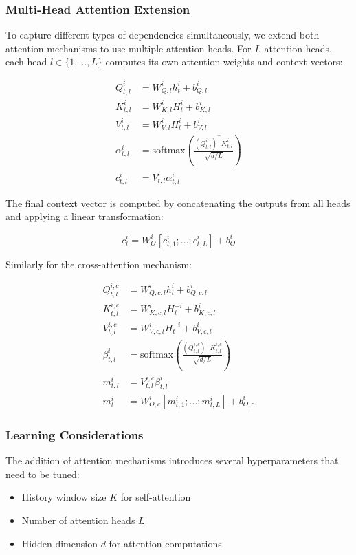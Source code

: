\subsubsection*{Multi-Head Attention Extension}
To capture different types of dependencies simultaneously, we extend both attention mechanisms to use multiple attention heads. For $L$ attention heads, each head $l \in \{1, ..., L\}$ computes its own attention weights and context vectors:

\begin{align*}
Q_{t,l}^i &= W_{Q,l}^i h_t^i + b_{Q,l}^i \\
K_{t,l}^i &= W_{K,l}^i H_t^i + b_{K,l}^i \\
V_{t,l}^i &= W_{V,l}^i H_t^i + b_{V,l}^i \\
\alpha_{t,l}^i &= \text{softmax}\left(\frac{(Q_{t,l}^i)^\top K_{t,l}^i}{\sqrt{d/L}}\right) \\
c_{t,l}^i &= V_{t,l}^i \alpha_{t,l}^i
\end{align*}

The final context vector is computed by concatenating the outputs from all heads and applying a linear transformation:

\[
c_t^i = W_O^i[c_{t,1}^i; ...; c_{t,L}^i] + b_O^i
\]

Similarly for the cross-attention mechanism:

\begin{align*}
Q_{t,l}^{i,c} &= W_{Q,c,l}^i h_t^i + b_{Q,c,l}^i \\
K_{t,l}^{i,c} &= W_{K,c,l}^i H_t^{-i} + b_{K,c,l}^i \\
V_{t,l}^{i,c} &= W_{V,c,l}^i H_t^{-i} + b_{V,c,l}^i \\
\beta_{t,l}^i &= \text{softmax}\left(\frac{(Q_{t,l}^{i,c})^\top K_{t,l}^{i,c}}{\sqrt{d/L}}\right) \\
m_{t,l}^i &= V_{t,l}^{i,c} \beta_{t,l}^i \\
m_t^i &= W_{O,c}^i[m_{t,1}^i; ...; m_{t,L}^i] + b_{O,c}^i
\end{align*}

\subsubsection*{Learning Considerations}
The addition of attention mechanisms introduces several hyperparameters that need to be tuned:
\begin{itemize}
\item History window size $K$ for self-attention
\item Number of attention heads $L$
\item Hidden dimension $d$ for attention computations
\end{itemize}

